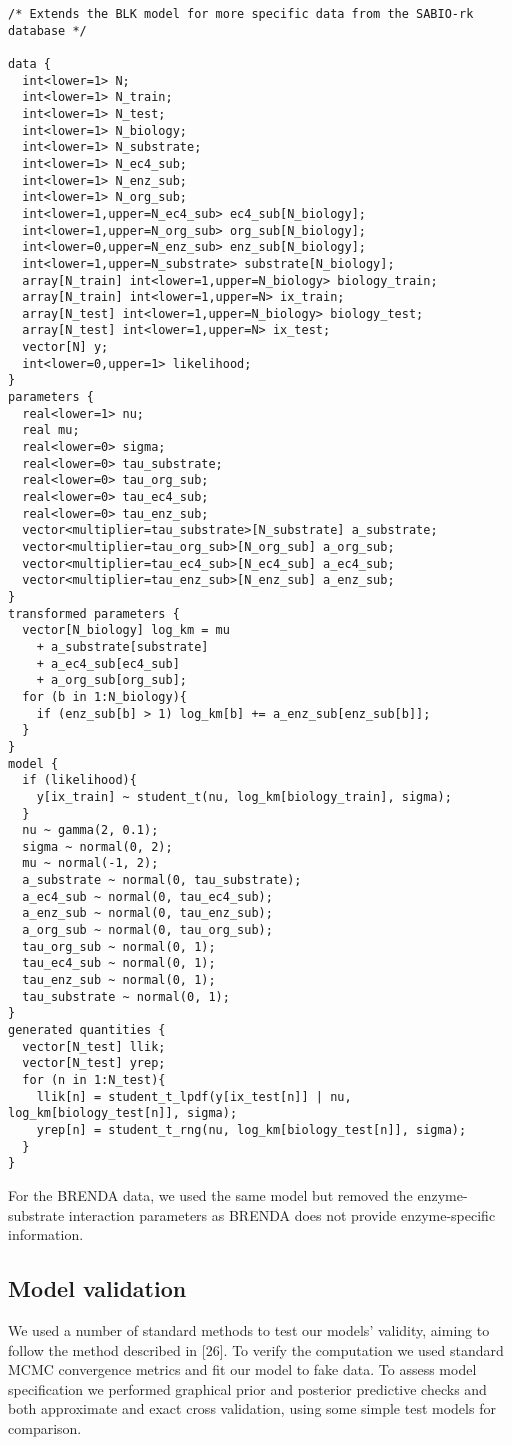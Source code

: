 \documentclass[11pt]{article}
\makeatletter
\newcommand{\citeprocitem}[2]{\hyper@linkstart{cite}{citeproc_bib_item_#1}#2\hyper@linkend}
\makeatother
\begin{document}
\begin{verbatim}
/* Extends the BLK model for more specific data from the SABIO-rk database */

data {
  int<lower=1> N;
  int<lower=1> N_train;
  int<lower=1> N_test;
  int<lower=1> N_biology;
  int<lower=1> N_substrate;
  int<lower=1> N_ec4_sub;
  int<lower=1> N_enz_sub;
  int<lower=1> N_org_sub;
  int<lower=1,upper=N_ec4_sub> ec4_sub[N_biology];
  int<lower=1,upper=N_org_sub> org_sub[N_biology];
  int<lower=0,upper=N_enz_sub> enz_sub[N_biology];
  int<lower=1,upper=N_substrate> substrate[N_biology];
  array[N_train] int<lower=1,upper=N_biology> biology_train;
  array[N_train] int<lower=1,upper=N> ix_train;
  array[N_test] int<lower=1,upper=N_biology> biology_test;
  array[N_test] int<lower=1,upper=N> ix_test;
  vector[N] y;
  int<lower=0,upper=1> likelihood;
}
parameters {
  real<lower=1> nu;
  real mu;
  real<lower=0> sigma;
  real<lower=0> tau_substrate;
  real<lower=0> tau_org_sub;
  real<lower=0> tau_ec4_sub;
  real<lower=0> tau_enz_sub;
  vector<multiplier=tau_substrate>[N_substrate] a_substrate;
  vector<multiplier=tau_org_sub>[N_org_sub] a_org_sub;
  vector<multiplier=tau_ec4_sub>[N_ec4_sub] a_ec4_sub;
  vector<multiplier=tau_enz_sub>[N_enz_sub] a_enz_sub;
}
transformed parameters {
  vector[N_biology] log_km = mu
    + a_substrate[substrate]
    + a_ec4_sub[ec4_sub]
    + a_org_sub[org_sub];
  for (b in 1:N_biology){
    if (enz_sub[b] > 1) log_km[b] += a_enz_sub[enz_sub[b]];
  }
}
model {
  if (likelihood){
    y[ix_train] ~ student_t(nu, log_km[biology_train], sigma);
  }
  nu ~ gamma(2, 0.1);
  sigma ~ normal(0, 2);
  mu ~ normal(-1, 2);
  a_substrate ~ normal(0, tau_substrate);
  a_ec4_sub ~ normal(0, tau_ec4_sub);
  a_enz_sub ~ normal(0, tau_enz_sub);
  a_org_sub ~ normal(0, tau_org_sub);
  tau_org_sub ~ normal(0, 1);
  tau_ec4_sub ~ normal(0, 1);
  tau_enz_sub ~ normal(0, 1);
  tau_substrate ~ normal(0, 1);
}
generated quantities {
  vector[N_test] llik;
  vector[N_test] yrep;
  for (n in 1:N_test){
    llik[n] = student_t_lpdf(y[ix_test[n]] | nu, log_km[biology_test[n]], sigma);
    yrep[n] = student_t_rng(nu, log_km[biology_test[n]], sigma);
  }
}
\end{verbatim}

For the BRENDA data, we used the same model but removed the enzyme-substrate
interaction parameters as BRENDA does not provide enzyme-specific information.

\subsection{Model validation}
\label{sec:org2229895}
We used a number of standard methods to test our models' validity, aiming to
follow the method described in \citeprocitem{26}{[26]}. To verify the
computation we used standard MCMC convergence metrics and fit our model to fake
data. To assess model specification we performed graphical prior and posterior
predictive checks and both approximate and exact cross validation, using some
simple test models for comparison.
\end{document}
